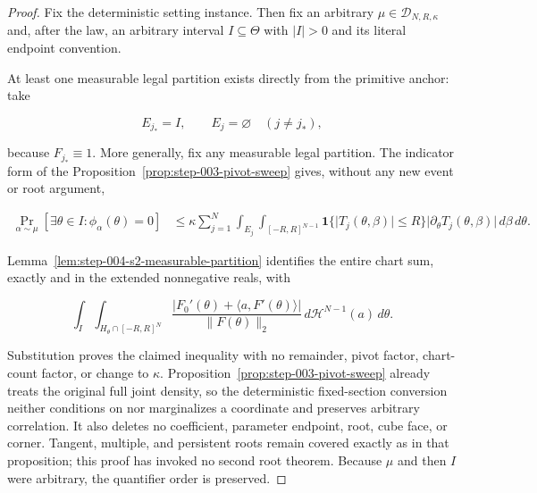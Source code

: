 \begin{proof}
Fix the deterministic setting instance. Then fix an arbitrary
\(\mu\in\mathcal D_{N,R,\kappa}\) and, after the law, an arbitrary interval
\(I\subseteq\Theta\) with \(\lvert I\rvert>0\) and its literal endpoint convention.

At least one measurable legal partition exists directly from the primitive anchor: take

\begin{equation}
\label{eq:appendix-display-142}
E_{j_*}=I,
\qquad
E_j=\varnothing\quad(j\neq j_*),
\end{equation}

because \(F_{j_*}\equiv1\). More generally, fix any measurable legal partition. The indicator form of the
Proposition~\ref{prop:step-003-pivot-sweep} gives, without any new event or root argument,

\begin{equation}
\label{eq:appendix-display-143}
\begin{aligned}
\Pr_{\alpha\sim\mu}[\exists\theta\in I:\phi_\alpha(\theta)=0]
&\leq
\kappa\sum_{j=1}^N\int_{E_j}\int_{[-R,R]^{N-1}}
\mathbf1\{\lvert T_j(\theta,\beta)\rvert\leq R\}
\lvert\partial_\theta T_j(\theta,\beta)\rvert
\,d\beta\,d\theta.
\end{aligned}
\end{equation}

Lemma~\ref{lem:step-004-s2-measurable-partition} identifies the entire chart sum, exactly and in the extended
nonnegative reals, with

\begin{equation}
\label{eq:appendix-display-144}
\int_I\int_{H_\theta\cap[-R,R]^N}
\frac{\lvert F_0'(\theta)+\langle a,F'(\theta)\rangle\rvert}
{\lVert F(\theta)\rVert_2}
\,d\mathcal H^{N-1}(a)\,d\theta.
\end{equation}

Substitution proves the claimed inequality with no remainder, pivot factor, chart-count factor, or change to
\(\kappa\). Proposition~\ref{prop:step-003-pivot-sweep} already treats the original full joint density, so the deterministic
fixed-section conversion neither conditions on nor marginalizes a coordinate and preserves arbitrary
correlation. It also deletes no coefficient, parameter endpoint, root, cube face, or corner. Tangent, multiple,
and persistent roots remain covered exactly as in that proposition; this proof has invoked no second
root theorem. Because \(\mu\) and then \(I\) were arbitrary, the quantifier order is preserved.

\end{proof}


